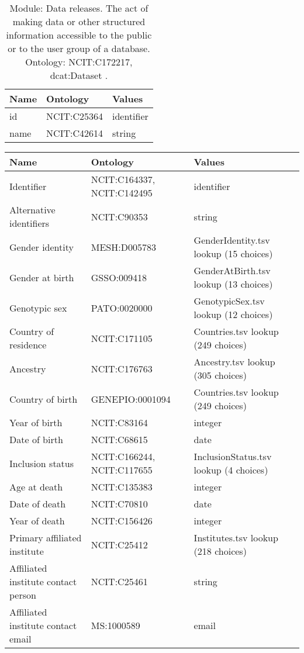 \documentclass{article}
\begin{document}
\begin{table}[htb]
\begin{tabular}{lll}
Name & Ontology & Values \\
\hline
id & NCIT:C25364  & identifier \\
name & NCIT:C42614  & string \\
\hline
\end{tabular}
\caption[Module: Data releases]{\label{table:table3} Module: Data releases. The act of making data or other structured information accessible to the public or to the user group of a database. Ontology: NCIT:C172217, dcat:Dataset . }
\end{table}

\begin{table}[htb]
\begin{tabular}{lll}
Name & Ontology & Values \\
\hline
Identifier & NCIT:C164337, NCIT:C142495  & identifier \\
Alternative identifiers & NCIT:C90353  & string \\
Gender identity & MESH:D005783  & GenderIdentity.tsv lookup (15 choices) \\
Gender at birth & GSSO:009418  & GenderAtBirth.tsv lookup (13 choices) \\
Genotypic sex & PATO:0020000  & GenotypicSex.tsv lookup (12 choices) \\
Country of residence & NCIT:C171105  & Countries.tsv lookup (249 choices) \\
Ancestry & NCIT:C176763  & Ancestry.tsv lookup (305 choices) \\
Country of birth & GENEPIO:0001094  & Countries.tsv lookup (249 choices) \\
Year of birth & NCIT:C83164  & integer \\
Date of birth & NCIT:C68615  & date \\
Inclusion status & NCIT:C166244, NCIT:C117655  & InclusionStatus.tsv lookup (4 choices) \\
Age at death & NCIT:C135383  & integer \\
Date of death & NCIT:C70810  & date \\
Year of death & NCIT:C156426  & integer \\
Primary affiliated institute & NCIT:C25412  & Institutes.tsv lookup (218 choices) \\
Affiliated institute contact person & NCIT:C25461  & string \\
Affiliated institute contact email & MS:1000589  & email \\

\end{tabular}
\end{table}
\end{document}
